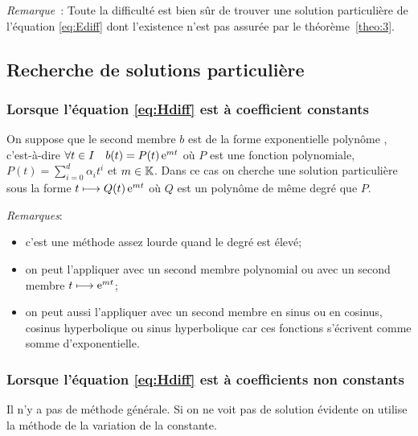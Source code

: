 \emph{Remarque}~: Toute la difficulté est bien sûr de trouver une solution particulière de l'équation \eqref{eq:Ediff} dont l'existence n'est pas assurée par le théorème~\ref{theo:3}.

\subsection{Recherche de solutions particulière}
\label{subsec:recherchesolutionpart}
\subsubsection{Lorsque l'équation \eqref{eq:Hdiff} est à coefficient constants}
\label{subsubsec:recherchesolutionpart-coefconstants}
On suppose que le second membre \(b\) est de la forme \og exponentielle polynôme \fg{}, c'est-à-dire \(\forall t \in I \quad b(t)=P(t) \operatorname{e}^{mt}\) où \(P\) est une fonction polynomiale, \(P(t)=\sum_{i=0}^d \alpha_i t^i\) et \(m \in \mathbb{K}\). Dans ce cas on cherche une solution particulière sous la forme \(t \longmapsto Q(t)\operatorname{e}^{mt}\) où \(Q\) est un polynôme de même degré que \(P\).

\emph{Remarques}:
\begin{itemize}
\item c'est une méthode assez lourde quand le degré est élevé;
\item on peut l'appliquer avec un second membre polynomial ou avec un second membre \(t \longmapsto \operatorname{e}^{mt}\);
\item on peut aussi l'appliquer avec un second membre en sinus ou en cosinus, cosinus hyperbolique ou sinus hyperbolique car ces fonctions s'écrivent comme somme d'exponentielle.
\end{itemize}
\subsubsection{Lorsque l'équation \eqref{eq:Hdiff} est à coefficients non constants}
\label{subsubsec:recherchesolutionpart-coefnnconstants}
Il n'y a pas de méthode générale. Si on ne voit pas de solution \og évidente \fg{} on utilise la méthode de la variation de la constante.
%
